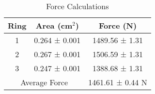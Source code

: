 \begin{table}[h]
\centering
\begin{tabular}{|c|c|c|}
\hline
Ring & Area (cm$^2$) & Force (N) \\
\hline
1 & 0.264 ± 0.001 & 1489.56 ± 1.31 \\
2 & 0.267 ± 0.001 & 1506.59 ± 1.31 \\
3 & 0.247 ± 0.001 & 1388.68 ± 1.31 \\
\hline
\multicolumn{2}{|c|}{Average Force} & 1461.61 ± 0.44 N \\
\hline
\end{tabular}
\caption{Force Calculations}
\label{tab:force_results}
\end{table}